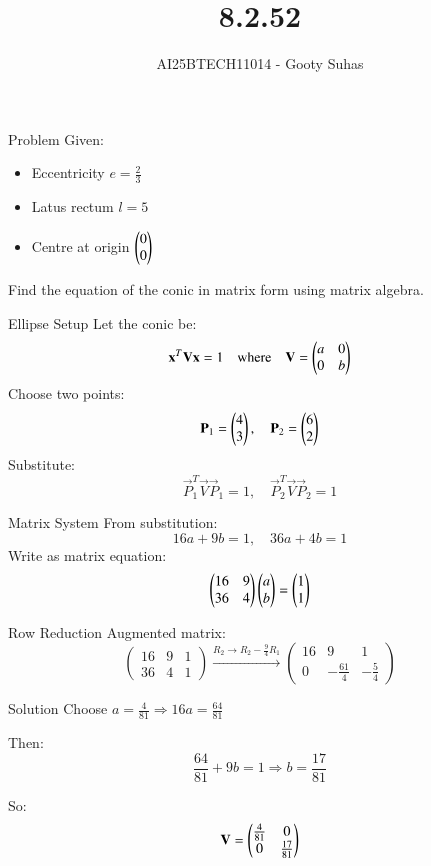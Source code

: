 \documentclass{beamer}
\title{8.2.52}
\author{AI25BTECH11014 - Gooty Suhas}
\begin{document}
\frame{\titlepage}

\begin{frame}{Problem}
Given:
\begin{itemize}
  \item Eccentricity \( e = \frac{2}{3} \)
  \item Latus rectum \( l = 5 \)
  \item Centre at origin \( \begin{pmatrix}0 \\ 0\end{pmatrix} \)
\end{itemize}
Find the equation of the conic in matrix form using matrix algebra.
\end{frame}

\begin{frame}{Ellipse Setup}
Let the conic be:
\[
\mathbf{x}^T \mathbf{V} \mathbf{x} = 1
\quad \text{where} \quad
\mathbf{V} = \begin{pmatrix}a & 0 \\ 0 & b\end{pmatrix}
\]
Choose two points:
\[
\mathbf{P}_1 = \begin{pmatrix}4 \\ 3\end{pmatrix}, \quad
\mathbf{P}_2 = \begin{pmatrix}6 \\ 2\end{pmatrix}
\]
Substitute:
\[
\vec{P}_1^T \vec{V} \vec{P}_1 = 1, \quad
\vec{P}_2^T \vec{V} \vec{P}_2 = 1
\]
\end{frame}

\begin{frame}{Matrix System}
From substitution:
\[
16a + 9b = 1, \quad
36a + 4b = 1
\]
Write as matrix equation:
\[
\begin{pmatrix}
16 & 9 \\
36 & 4
\end{pmatrix}
\begin{pmatrix}a \\ b\end{pmatrix}
=
\begin{pmatrix}1 \\ 1\end{pmatrix}
\]
\end{frame}

\begin{frame}{Row Reduction}
Augmented matrix:
\[
\left(
\begin{array}{cc|c}
16 & 9 & 1 \\
36 & 4 & 1
\end{array}
\right)
\xrightarrow{R_2 \rightarrow R_2 - \frac{9}{4} R_1}
\left(
\begin{array}{cc|c}
16 & 9 & 1 \\
0 & -\frac{61}{4} & -\frac{5}{4}
\end{array}
\right)
\]
\end{frame}

\begin{frame}{Solution}
Choose \( a = \frac{4}{81} \Rightarrow 16a = \frac{64}{81} \)

Then:
\[
\frac{64}{81} + 9b = 1
\Rightarrow b = \frac{17}{81}
\]

So:
\[
\mathbf{V} = \begin{pmatrix}\frac{4}{81} & 0 \\ 0 & \frac{17}{81}\end{pmatrix}
\]
\end{frame}
\end{document}
